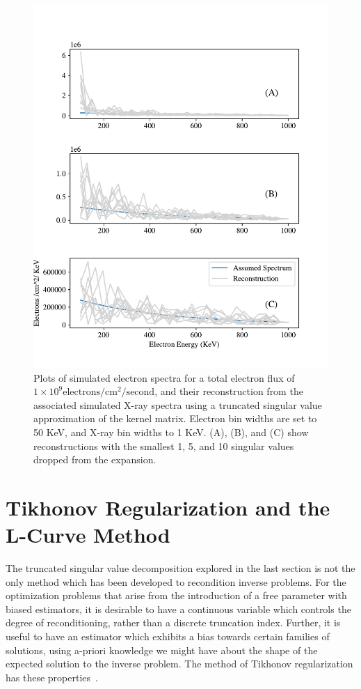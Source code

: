 \begin{figure}[p]
    \centering
    \includegraphics[width=.95\textwidth]{figures/chapter_4/tsvd_test/tsvd_test_2.pdf}
    \caption{Plots of simulated electron spectra for a total electron flux of $1\times10^9 \mbox{electrons} / \mbox{cm}^2 / \mbox{second}$, and their reconstruction from the associated simulated X-ray spectra using a truncated singular value approximation of the kernel matrix. Electron bin widths are set to 50 KeV, and X-ray bin widths to 1 KeV. (A), (B), and (C) show reconstructions with the smallest 1, 5, and 10 singular values dropped from the expansion.}
    \label{tsvd_test}
\end{figure}

\section{Tikhonov Regularization and the L-Curve Method}

The truncated singular value decomposition explored in the last section is not the only method which has been developed to recondition inverse problems. For the optimization problems that arise from the introduction of a free parameter with biased estimators, it is desirable to have a continuous variable which controls the degree of reconditioning, rather than a discrete truncation index. Further, it is useful to have an estimator which exhibits a bias towards certain families of solutions, using a-priori knowledge we might have about the shape of the expected solution to the inverse problem. The method of Tikhonov regularization has these properties~\citep{Tikhonov1995NumericalMF}.

